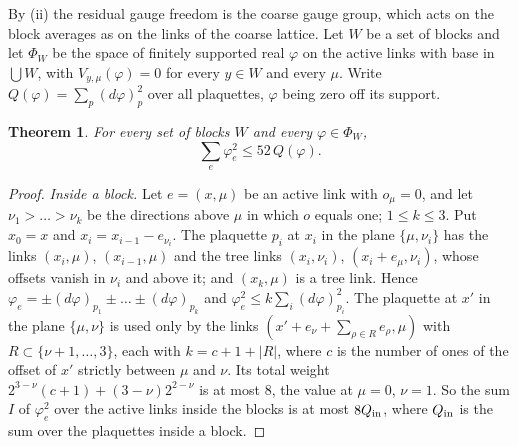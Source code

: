 \documentclass[11pt]{amsart}
\newtheorem{theorem}{Theorem}[section]
\theoremstyle{definition}
\theoremstyle{remark}
\numberwithin{equation}{section}
\begin{document}
By (ii) the residual gauge freedom is the coarse gauge group, which acts on
the block averages as on the links of the coarse lattice. Let $W$ be a set
of blocks and let $\Phi_W$ be the space of finitely supported real $\varphi$
on the active links with base in $\bigcup W$, with $V_{y,\mu}(\varphi)=0$ for
every $y\in W$ and every $\mu$. Write $Q(\varphi)=\sum_p(d\varphi)_p^2$ over
all plaquettes, $\varphi$ being zero off its support.

\begin{theorem}\label{thm:blockgap}
For every set of blocks $W$ and every $\varphi\in\Phi_W$,
\[
\sum_e\varphi_e^2\le52\,Q(\varphi).
\]
\end{theorem}

\begin{proof}
\emph{Inside a block.} Let $e=(x,\mu)$ be an active link with $o_\mu=0$, and
let $\nu_1>\dots>\nu_k$ be the directions above $\mu$ in which $o$ equals one;
$1\le k\le3$. Put $x_0=x$ and $x_i=x_{i-1}-e_{\nu_i}$. The plaquette $p_i$ at
$x_i$ in the plane $\{\mu,\nu_i\}$ has the links $(x_i,\mu)$, $(x_{i-1},\mu)$
and the tree links $(x_i,\nu_i)$, $(x_i+e_\mu,\nu_i)$, whose offsets vanish in
$\nu_i$ and above it; and $(x_k,\mu)$ is a tree link. Hence $\varphi_e=\pm
(d\varphi)_{p_1}\pm\dots\pm(d\varphi)_{p_k}$ and $\varphi_e^2\le k\sum_i
(d\varphi)_{p_i}^2$. The plaquette at $x'$ in the plane $\{\mu,\nu\}$ is used
only by the links $(x'+e_\nu+\sum_{\rho\in R}e_\rho,\mu)$ with $R\subset\{\nu+1,
\dots,3\}$, each with $k=c+1+|R|$, where $c$ is the number of ones of the
offset of $x'$ strictly between $\mu$ and $\nu$. Its total weight
$2^{3-\nu}(c+1)+(3-\nu)2^{2-\nu}$ is at most $8$, the value at $\mu=0$,
$\nu=1$. So the sum $I$ of $\varphi_e^2$ over the active links inside the
blocks is at most $8Q_{\rm in}$, where $Q_{\rm in}$ is the sum over the
plaquettes inside a block.


\end{proof}
\end{document}
